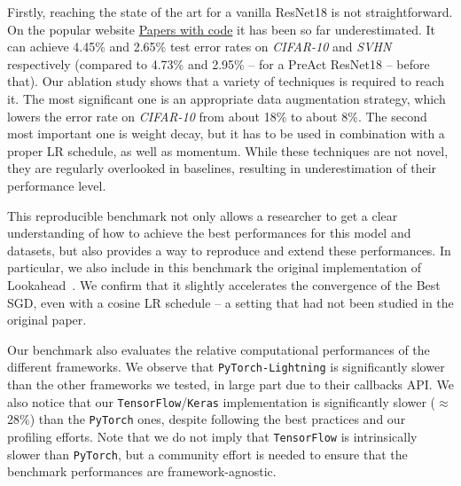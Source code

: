 \documentclass{article}
\newcommand{\PyTorch}{{{\texttt{PyTorch}}}}
\newcommand{\TensorFlow}{{{\texttt{TensorFlow}}}}
\newcommand{\Keras}{\texttt{Keras}}
\begin{document}
Firstly, reaching the state of the art for a vanilla ResNet18 is not straightforward.
On the popular website \href{https://paperswithcode.com/}{Papers with code} it has been so far underestimated.
It can achieve 4.45\% and 2.65\% test error rates on \emph{CIFAR-10} and \emph{SVHN} respectively (compared to 4.73\% and 2.95\% -- for a PreAct ResNet18 -- before that).
Our ablation study shows that a variety of techniques is required to reach it.
The most significant one is an appropriate data augmentation strategy, which lowers the error rate on \emph{CIFAR-10} from about 18\% to about 8\%.
The second most important one is weight decay, but it has to be used in combination with a proper LR schedule, as well as momentum.
While these techniques are not novel, they are regularly overlooked in baselines, resulting in underestimation of their performance level.

This reproducible benchmark not only allows a researcher to get a clear understanding of how to achieve the best performances for this model and datasets, but also provides a way to reproduce and extend these performances.
In particular, we also include in this benchmark the original implementation of Lookahead~\citep{zhang2019lookahead}.
We confirm that it slightly accelerates the convergence of the Best SGD, even with a cosine LR schedule -- a setting that had not been studied in the original paper.



Our benchmark also evaluates the relative computational performances of the different frameworks.
We observe that \texttt{PyTorch-Lightning} is significantly slower than the other frameworks we tested, in large part due to their callbacks API.
We also notice that our \TensorFlow/\Keras{} implementation is significantly slower ($\approx$ 28\%) than the \PyTorch{} ones, despite following the best practices and our profiling efforts.
Note that we do not imply that \TensorFlow{} is intrinsically slower than \PyTorch{}, but a community effort is needed to ensure that the benchmark performances are framework-agnostic.
\end{document}
